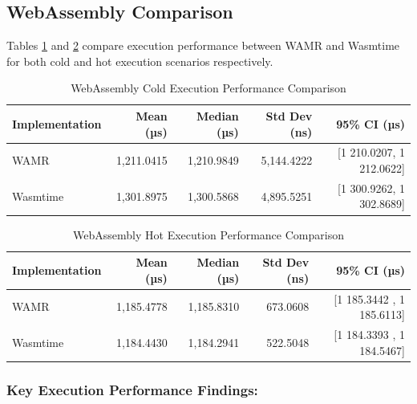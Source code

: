 \subsection{WebAssembly Comparison}
\label{subsec:eval-execution-wasm}

Tables \ref{tab:wasm-execution-cold} and \ref{tab:wasm-execution-hot} compare execution performance between WAMR and Wasmtime for both cold and hot execution scenarios respectively.

\begin{table}[htbp]
    \centering
    \caption{WebAssembly Cold Execution Performance Comparison}
    \label{tab:wasm-execution-cold}
    \begin{tabular}{lrrrr}
        \toprule
        \textbf{Implementation} & \textbf{Mean (µs)} & \textbf{Median (µs)} & \textbf{Std Dev (ns)} & \textbf{95\% CI (µs)} \\
        \midrule
        WAMR      & 1,211.0415 & 1,210.9849 & 5,144.4222 & [1 210.0207, 1 212.0622] \\
        Wasmtime  & 1,301.8975 & 1,300.5868 & 4,895.5251 & [1 300.9262, 1 302.8689] \\
        \bottomrule
    \end{tabular}
\end{table}

\begin{table}[htbp]
    \centering
    \caption{WebAssembly Hot Execution Performance Comparison}
    \label{tab:wasm-execution-hot}
    \begin{tabular}{lrrrr}
        \toprule
        \textbf{Implementation} & \textbf{Mean (µs)} & \textbf{Median (µs)} & \textbf{Std Dev (ns)} & \textbf{95\% CI (µs)} \\
        \midrule
        WAMR      & 1,185.4778 & 1,185.8310 & 673.0608 & [1 185.3442 , 1 185.6113] \\
        Wasmtime  & 1,184.4430 & 1,184.2941 & 522.5048 & [1 184.3393 , 1 184.5467] \\
        \bottomrule
    \end{tabular}
\end{table}

\subsubsection{Key Execution Performance Findings:}

